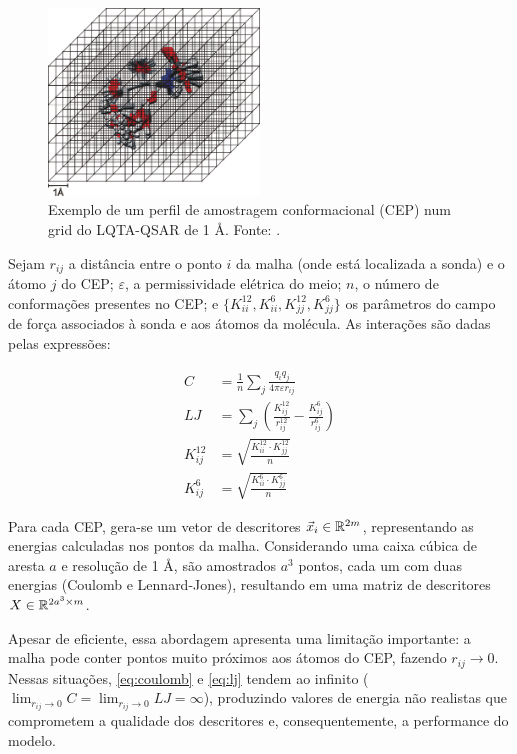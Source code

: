\begin{figure}
    \centering
    \includegraphics[width=0.5\textwidth]{img/LQTAQSAR_CEP.png}
    \caption{Exemplo de um perfil de amostragem conformacional (CEP) num grid do LQTA-QSAR de 1 \AA. Fonte: \textcite{LQTAQSAR2009}.}
    \label{fig:LQTA-QSAR}
  \end{figure}

Sejam $r_{ij}$ a distância entre o ponto $i$ da malha (onde está localizada a sonda) e o átomo $j$ do CEP; $\varepsilon$, a permissividade elétrica do meio; $n$, o número de conformações presentes no CEP; e $\{K_{ii}^{12}, K_{ii}^6, K_{jj}^{12}, K_{jj}^6\}$ os parâmetros do campo de força associados à sonda e aos átomos da molécula. As interações são dadas pelas expressões:

\begin{align}
    C &= \frac{1}{n} \sum_j \frac{q_i q_j}{4 \pi \varepsilon r_{ij}} \label{eq:coulomb} \\
    LJ &= \sum_j \left( \frac{K_{ij}^{12}}{r_{ij}^{12}} - \frac{K_{ij}^{6}}{r_{ij}^{6}} \right) \label{eq:lj} \\
    K_{ij}^{12} &= \sqrt{ \frac{K_{ii}^{12} \cdot K_{jj}^{12} }{n} } \\
    K_{ij}^{6} &= \sqrt{ \frac{K_{ii}^{6} \cdot K_{jj}^{6} }{n} }
\end{align}

Para cada CEP, gera-se um vetor de descritores $\vec{x}_i \in \mathbb{R}^{2m}$, representando as energias calculadas nos pontos da malha. Considerando uma caixa cúbica de aresta $a$ e resolução de 1 \AA, são amostrados $a^3$ pontos, cada um com duas energias (Coulomb e Lennard-Jones), resultando em uma matriz de descritores $X \in \mathbb{R}^{2a^3 \times m}$.

Apesar de eficiente, essa abordagem apresenta uma limitação importante: a malha pode conter pontos muito próximos aos átomos do CEP, fazendo $r_{ij} \to 0$. Nessas situações, \eqref{eq:coulomb} e \eqref{eq:lj} tendem ao infinito ($\lim_{r_{ij} \to 0} C = \lim_{r_{ij} \to 0} LJ = \infty$), produzindo valores de energia não realistas que comprometem a qualidade dos descritores e, consequentemente, a performance do modelo.

